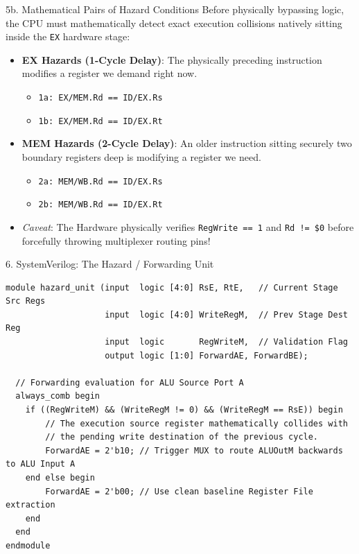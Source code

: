 \documentclass[aspectratio=169]{beamer}
\begin{document}
\begin{frame}{5b. Mathematical Pairs of Hazard Conditions}
Before physically bypassing logic, the CPU must mathematically detect exact execution collisions natively sitting inside the \texttt{EX} hardware stage:
\begin{itemize}
    \item \textbf{EX Hazards (1-Cycle Delay)}: The physically preceding instruction modifies a register we demand right now.
    \begin{itemize}
        \item \texttt{1a: EX/MEM.Rd == ID/EX.Rs}
        \item \texttt{1b: EX/MEM.Rd == ID/EX.Rt}
    \end{itemize}
    \item \textbf{MEM Hazards (2-Cycle Delay)}: An older instruction sitting securely two boundary registers deep is modifying a register we need.
    \begin{itemize}
        \item \texttt{2a: MEM/WB.Rd == ID/EX.Rs}
        \item \texttt{2b: MEM/WB.Rd == ID/EX.Rt}
    \end{itemize}
    \item \textit{Caveat}: The Hardware physically verifies \texttt{RegWrite == 1} and \texttt{Rd != \$0} before forcefully throwing multiplexer routing pins!
\end{itemize}
\end{frame}

\begin{frame}[fragile]{6. SystemVerilog: The Hazard / Forwarding Unit}
\begin{verbatim}
module hazard_unit (input  logic [4:0] RsE, RtE,   // Current Stage Src Regs
                    input  logic [4:0] WriteRegM,  // Prev Stage Dest Reg
                    input  logic       RegWriteM,  // Validation Flag
                    output logic [1:0] ForwardAE, ForwardBE);

  // Forwarding evaluation for ALU Source Port A
  always_comb begin
    if ((RegWriteM) && (WriteRegM != 0) && (WriteRegM == RsE)) begin
        // The execution source register mathematically collides with 
        // the pending write destination of the previous cycle.
        ForwardAE = 2'b10; // Trigger MUX to route ALUOutM backwards to ALU Input A
    end else begin
        ForwardAE = 2'b00; // Use clean baseline Register File extraction
    end
  end
endmodule
\end{verbatim}
\end{frame}
\end{document}
